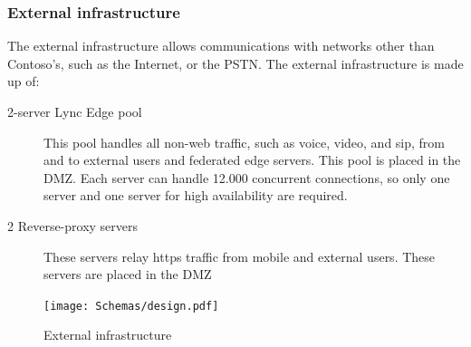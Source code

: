 	\subsubsection{External infrastructure}
	The external infrastructure allows communications with networks other than Contoso's, such as the Internet, or the PSTN.
	The external infrastructure is made up of:
	\begin{description}
		\item[2-server Lync Edge pool] This pool handles all non-web traffic, such as voice, video, and sip, from and to external users and federated edge servers. This pool is placed in the DMZ. Each server can handle 12.000 concurrent connections, so only one server and one server for high availability are required.
		
		\item[2 Reverse-proxy servers] These servers relay https traffic from mobile and external users. These servers are placed in the DMZ
	\end{description}
	\begin{figure}[H]
		\centering
		\texttt{[image: Schemas/design.pdf]}
		\caption{External infrastructure}
		\label{fig:case_external}
	\end{figure}

